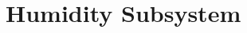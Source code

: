 \documentclass[../main]{subfiles}
\begin{document}
\chapter{Humidity Subsystem} \label{chp:humeSubsystem}


\end{document}
